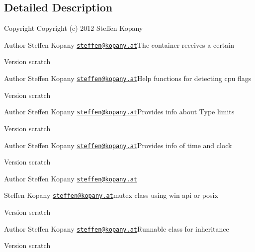 \subsection{Detailed Description}
\begin{DoxyCopyright}{Copyright}
Copyright (c) 2012 Steffen Kopany 
\end{DoxyCopyright}
\begin{DoxyAuthor}{Author}
Steffen Kopany \href{mailto:steffen@kopany.at}{\tt steffen@kopany.\-at}The container receives a certain 
\end{DoxyAuthor}
\begin{DoxyVersion}{Version}
scratch
\end{DoxyVersion}
\begin{DoxyAuthor}{Author}
Steffen Kopany \href{mailto:steffen@kopany.at}{\tt steffen@kopany.\-at}Help functions for detecting cpu flags 
\end{DoxyAuthor}
\begin{DoxyVersion}{Version}
scratch
\end{DoxyVersion}
\begin{DoxyAuthor}{Author}
Steffen Kopany \href{mailto:steffen@kopany.at}{\tt steffen@kopany.\-at}Provides info about Type limits 
\end{DoxyAuthor}
\begin{DoxyVersion}{Version}
scratch
\end{DoxyVersion}
\begin{DoxyAuthor}{Author}
Steffen Kopany \href{mailto:steffen@kopany.at}{\tt steffen@kopany.\-at}Provides info of time and clock 
\end{DoxyAuthor}
\begin{DoxyVersion}{Version}
scratch
\end{DoxyVersion}
\begin{DoxyAuthor}{Author}
Steffen Kopany \href{mailto:steffen@kopany.at}{\tt steffen@kopany.\-at}

Steffen Kopany \href{mailto:steffen@kopany.at}{\tt steffen@kopany.\-at}mutex class using win api or posix 
\end{DoxyAuthor}
\begin{DoxyVersion}{Version}
scratch
\end{DoxyVersion}
\begin{DoxyAuthor}{Author}
Steffen Kopany \href{mailto:steffen@kopany.at}{\tt steffen@kopany.\-at}Runnable class for inheritance 
\end{DoxyAuthor}
\begin{DoxyVersion}{Version}
scratch
\end{DoxyVersion}
